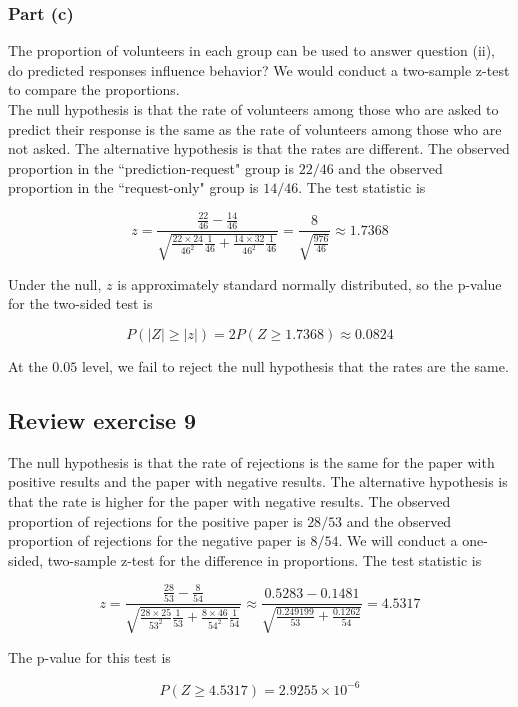 \documentclass[11pt]{article}
\newcommand{\pr}{P} %
\begin{document}
\subsubsection*{Part (c)}
The proportion of volunteers in each group can be used to answer question (ii), do predicted responses influence behavior?  We would conduct a two-sample z-test to compare the proportions. \\

The null hypothesis is that the rate of volunteers among those who are asked to predict their response is the same as the rate of volunteers among those who are not asked.  The alternative hypothesis is that the rates are different.  The observed proportion in the ``prediction-request" group is $22/46$ and the observed proportion in the ``request-only" group is $14/46$.  The test statistic is

$$z = \frac{ \frac{22}{46}-\frac{14}{46}}{ \sqrt{\frac{22\times 24}{46^2}\frac{1}{46} + \frac{14\times32}{46^2}\frac{1}{46}}} = \frac{ 8}{ \sqrt{\frac{976}{46}}} \approx  1.7368$$

Under the null, $z$ is approximately standard normally distributed, so the p-value for the two-sided test is

$$\pr( \lvert Z \rvert \geq \lvert z \rvert) = 2 \pr(Z \geq 1.7368) \approx 0.0824$$

At the $0.05$ level, we fail to reject the null hypothesis that the rates are the same.


\subsection*{Review exercise 9} %
The null hypothesis is that the rate of rejections is the same for the paper with positive results and the paper with negative results.  The alternative hypothesis is that the rate is higher for the paper with negative results.  The observed proportion of rejections for the positive paper is $28/53$ and the observed proportion of rejections for the negative paper is $8/54$. We will conduct a one-sided, two-sample z-test for the difference in proportions.  The test statistic is

$$z = \frac{\frac{28}{53} - \frac{8}{54}}{\sqrt{ \frac{28\times25}{53^2}\frac{1}{53} + \frac{8\times46}{54^2}\frac{1}{54}}} \approx \frac{ 0.5283 - 0.1481}{\sqrt{ \frac{ 0.249199}{53} + \frac{ 0.1262}{54}}} = 4.5317$$

The p-value for this test is

$$\pr(Z \geq 4.5317) = 2.9255 \times 10^{-6}$$
\end{document}
